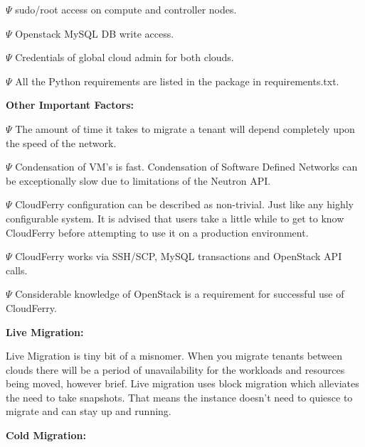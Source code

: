 \documentclass{article}
\begin{document}
$\Psi$ {\color{color03} sudo/root access on compute and controller nodes.}

$\Psi$ {\color{color03} Openstack MySQL DB write access.}

$\Psi$ {\color{color03} Credentials of global cloud admin for both clouds.}

$\Psi$ {\color{color03} All the Python requirements are listed in the package in 
requirements.txt.}

{\large{}{\color{color03} \textbf{Other Important Factors: }}}

\vspace{2pt}
\parindent=3pt
$\Psi$ {\color{color03} The amount of time it takes to migrate a tenant will depend 
completely upon the speed of the network.  }

$\Psi$ {\color{color03} Condensation of VM's is fast. Condensation of Software 
Defined Networks can be exceptionally slow due to limitations of the Neutron API. 
}

$\Psi$ {\color{color03} CloudFerry configuration can be described as non-trivial. 
Just like any highly configurable system. It is advised that users take a little 
while to get to know CloudFerry before attempting to use it on a production environment. 
 }

$\Psi$ {\color{color03} CloudFerry works via SSH/SCP, MySQL transactions and OpenStack 
API calls.  }

$\Psi$ {\color{color03} Considerable knowledge of OpenStack is a requirement for 
successful use of CloudFerry.}

\vspace{2pt}
\parindent=0pt
{\large{}{\color{color03} \textbf{Live Migration:}}}

\vspace{2pt}
{\color{color03} Live Migration is tiny bit of a misnomer. When you migrate tenants 
between clouds there will be a period of unavailability for the workloads and resources 
being moved, however brief. Live migration uses block migration which alleviates 
the need to take snapshots. That means the instance doesn't need to quiesce to 
migrate and can stay up and running.  }

\vspace{2pt}
{\large{}{\color{color03} \textbf{Cold Migration:}}}
\end{document}
